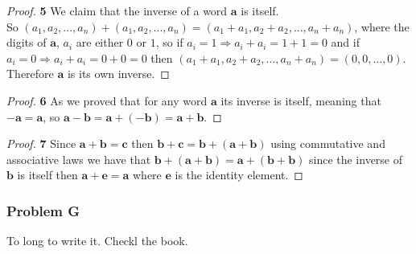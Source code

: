 \documentclass[11pt]{article}
\begin{document}
	\begin{proof}{\textbf{5}} We claim that the inverse of a word $\bm{a}$ is itself.\\
		So $(a_1, a_2, ..., a_n) + (a_1, a_2, ..., a_n) = (a_1+a_1, a_2+a_2,...,a_n+a_n)$, where the digits of $\bm{a}$, $a_i$ are either $0$ or $1$, so if $a_i=1 \Rightarrow a_i+a_i=1+1=0$ and if $a_i=0 \Rightarrow a_i+a_i=0+0=0$ then $(a_1+a_1, a_2+a_2,...,a_n+a_n)=(0,0,...,0)$.
		Therefore $\bm{a}$ is its own inverse.
	\end{proof}
	\begin{proof}{\textbf{6}}
		As we proved that for any word $\bm{a}$ its inverse is itself, meaning that $\bm{-a}=\bm{a}$, so $\bm{a}-\bm{b}=\bm{a}+(\bm{-b})=\bm{a}+\bm{b}$.
	\end{proof}	
	\begin{proof}{\textbf{7}}
		Since $\bm{a}+\bm{b}=\bm{c}$ then $\bm{b}+\bm{c}=\bm{b}+(\bm{a}+\bm{b})$ using commutative and associative laws we have that $\bm{b}+(\bm{a}+\bm{b})=\bm{a}+(\bm{b}+\bm{b})$ since the inverse of $\bm{b}$ is itself then $\bm{a}+\bm{e}=\bm{a}$ where $\bm{e}$ is the identity element.
	\end{proof}
	\subsubsection*{Problem G}
	To long to write it. Checkl the book.
\end{document}
